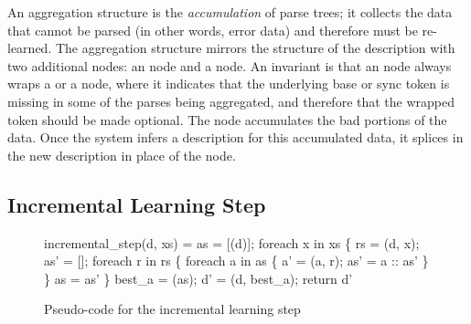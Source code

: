 An aggregation structure is the {\em accumulation} of parse trees; it
collects the data that cannot be parsed (in other words, error data)
and therefore must be re-learned.
The aggregation structure mirrors the structure of the description  
with two additional nodes: an  node and a  node. 
An invariant is that an  node always wraps a  or a  node,
where it indicates that the underlying base or sync token is missing
in some of the parses being aggregated, and therefore that the wrapped
token should be made optional. 
The  node accumulates the bad portions of the data.
Once the system infers a description for this accumulated data, it
splices in the new description in place of the  node.

\subsection{Incremental Learning Step}
\begin{figure}[t]
\begin{codebox}
incremental_step(d, xs) =
  as = [(d)];
  foreach x in xs \{
    rs = (d, x);
    as' = [];
    foreach r in rs \{
      foreach a in as \{
        a' = (a, r); 
        as' = a :: as'
      \}
    \}
    as = as'
  \} 
  best_a = (as);
  d' = (d, best_a);  
  return d'
\end{codebox}
\caption{Pseudo-code for the incremental learning step}
\label{fig:inc-learning}
\end{figure}

